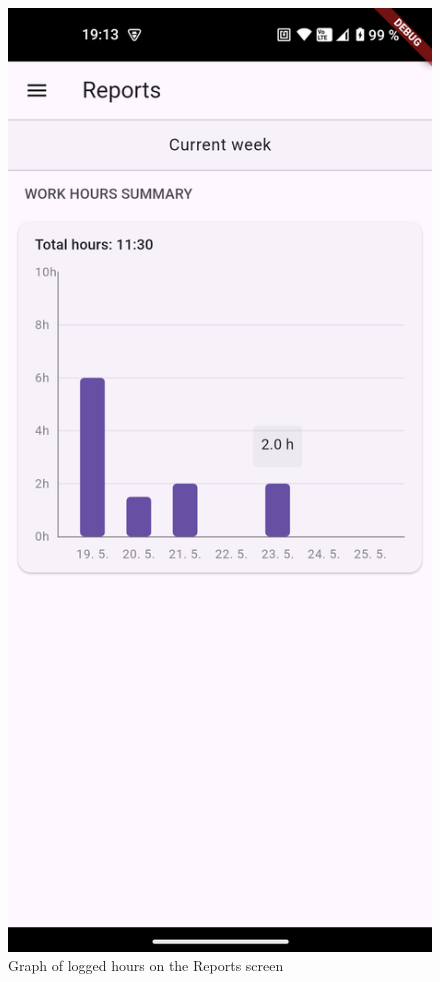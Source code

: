 \documentclass[
  digital,     %
  oneside,     %
  nosansbold,  %
  nocolorbold, %
  lof,         %
  lot,         %
]{fithesis4}
\begin{document}
\begin{center}
\begin{minipage}{0.45\textwidth}
  \begin{figure}[H]
    \centering
    \includegraphics[width=\textwidth]{assets/reports_screen.png}
    \caption{Graph of logged hours on the Reports screen}
    \label{fig:reports_screen}
  \end{figure}
\end{minipage}
\hspace{0.05\textwidth}
\begin{minipage}{0.45\textwidth}

\end{minipage}
\end{center}
\end{document}

